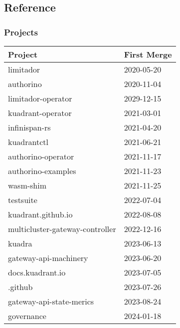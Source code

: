 \subsection{Reference}
\subsubsection{Projects}
\begin{center}
	\begin{tabular}{|l|l|}
		\hline
		\textbf{Project}                & \textbf{First Merge} \\
		\hline
		limitador                       & 2020-05-20           \\
		\hline
		authorino                       & 2020-11-04           \\
		\hline
		limitador-operator              & 2029-12-15           \\
		\hline
		kuadrant-operator               & 2021-03-01           \\
		\hline
		infinispan-rs                   & 2021-04-20           \\
		\hline
		kuadrantctl                     & 2021-06-21           \\
		\hline
		authorino-operator              & 2021-11-17           \\
		\hline
		authorino-examples              & 2021-11-23           \\
		\hline
		wasm-shim                       & 2021-11-25           \\
		\hline
		testsuite                       & 2022-07-04           \\
		\hline
		kuadrant.github.io              & 2022-08-08           \\
		\hline
		multicluster-gateway-controller & 2022-12-16           \\
		\hline
		kuadra                          & 2023-06-13           \\
		\hline
		gateway-api-machinery           & 2023-06-20           \\
		\hline
		docs.kuadrant.io                & 2023-07-05           \\
		\hline
		.github                         & 2023-07-26           \\
		\hline
		gateway-api-state-merics        & 2023-08-24           \\
		\hline
		governance                      & 2024-01-18           \\
		\hline
	\end{tabular}

\end{center}

